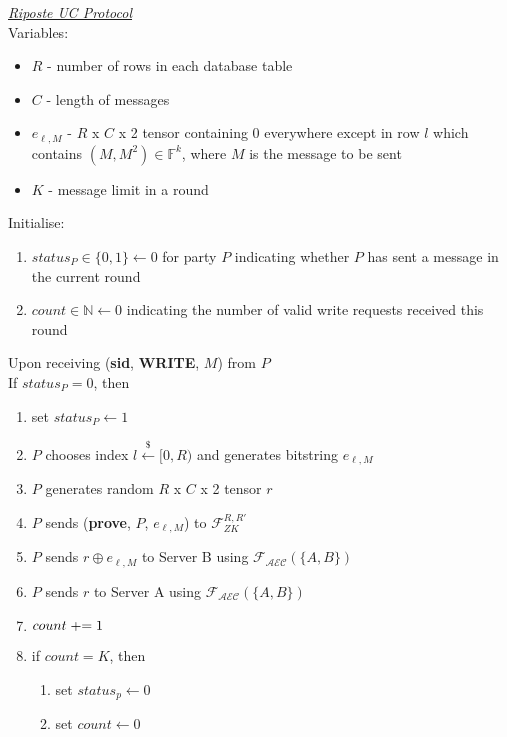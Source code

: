 



\begin{tcolorbox}[colback=white, arc=5pt]
\noindent\emph{\underline{Riposte UC Protocol}}\\[5pt]
Variables:
\begin{itemize}
    \item $R$ - number of rows in each database table
    \item $C$ - length of messages
    \item $e_{\ell,M}$ - $R$ x $C$ x 2 tensor containing 0 everywhere except in row $l$ which contains $(M, M^2)\in \mathbb{F}^k$, where $M$ is the message to be sent
    \item $K$ - message limit in a round
\end{itemize}
Initialise:
\begin{enumerate}
    \item $status_P\in\{0,1\}\leftarrow 0$ for party $P$ indicating whether $P$ has sent a message in the current round
    \item $count\in\mathbb{N}\leftarrow 0$ indicating the number of valid write requests received this round
\end{enumerate}
\extitem Upon receiving (\textbf{sid}, \textbf{WRITE}, $M$) from $P$\\
If $status_P=0$, then
\begin{enumerate}
    \item set $status_P\leftarrow 1$
    \item $P$ chooses index $l \overset{{\scriptscriptstyle\$}}{\leftarrow} [0,R)$ and generates bitstring $e_{\ell,M}$
    \item $P$ generates random $R$ x $C$ x 2 tensor $r$
    \item $P$ sends (\textbf{prove}, $P$, $e_{\ell,M}$) to $\mathcal{F}_{ZK}^{R,R'}$
    \item $P$ sends $r\oplus e_{\ell,M}$ to Server B using $\mathcal{F}_{\mathcal{AEC}}(\{A,B\})$
    \item $P$ sends $r$ to Server A using $\mathcal{F}_{\mathcal{AEC}}(\{A,B\})$
    
    \item $count \mathrel{+}= 1$
    \item if $count=K$, then
    \begin{enumerate}
        \item set $status_p\leftarrow0$
        \item set $count \leftarrow 0$
    \end{enumerate}
\end{enumerate}


\end{tcolorbox}

